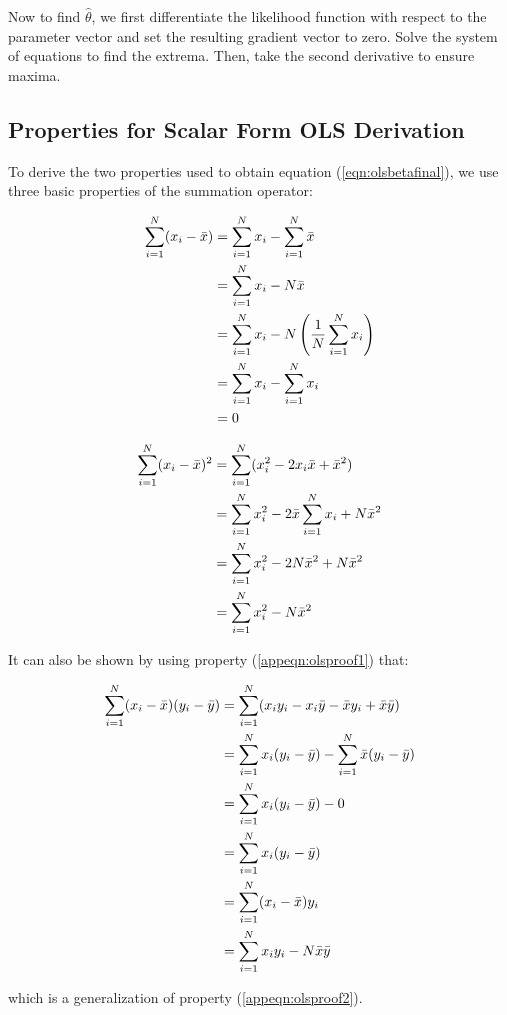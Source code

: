\documentclass{article}
\begin{document}
\noindent Now to find $\hat{\theta}$, we first differentiate the likelihood function with respect to the parameter vector and set the resulting gradient vector to zero. Solve the system of equations to find the extrema. Then, take the second derivative to ensure maxima.




\newpage
{}
\begin{appendices}

\section{Properties for Scalar Form OLS Derivation}\label{app:olspropertiesderiv}

To derive the two properties used to obtain equation (\ref{eqn:olsbetafinal}), we use three basic properties of the summation operator:

\begin{align}\label{appeqn:olsproof1}
    \sum_{i=1}^N (x_i - \Bar{x}) &= \sum_{i=1}^N x_i - \sum_{i=1}^N \Bar{x} \\ \nonumber
    &= \sum_{i=1}^N x_i - N \Bar{x} \\ \nonumber
    &= \sum_{i=1}^N x_i - N \left (\frac{1}{N} \sum_{i=1}^N x_i \right ) \\ \nonumber
    &= \sum_{i=1}^N x_i - \sum_{i=1}^N x_i \\ \nonumber
    &= 0
\end{align} 

\begin{align}\label{appeqn:olsproof2}
        \sum_{i=1}^N (x_i - \Bar{x})^2 &= \sum_{i=1}^N (x_i^2 - 2x_i \Bar{x}  + \Bar{x}^2) \\ \nonumber
        &= \sum_{i=1}^N x_i^2 - 2\Bar{x} \sum_{i=1}^N x_i + N\Bar{x}^2 \\ \nonumber
        &= \sum_{i=1}^N x_i^2 - 2N\Bar{x}^2 + N\Bar{x}^2 \\ \nonumber
        &= \sum_{i=1}^Nx_i^2 - N\Bar{x}^2 
\end{align}

\noindent It can also be shown by using property (\ref{appeqn:olsproof1}) that: 

\begin{align}\label{appeqn:olsproof3}
    \sum_{i=1}^N (x_i - \Bar{x})(y_i - \Bar{y}) &= \sum_{i=1}^N ( x_i y_i - x_i \Bar{y} - \Bar{x}y_i + \Bar{x} \Bar{y}) \\ \nonumber
    &= \sum_{i=1}^N x_i(y_i - \Bar{y}) - \sum_{i=1}^N \Bar{x}(y_i - \Bar{y}) \\ \nonumber
    &= \sum_{i=1}^N x_i(y_i - \Bar{y}) - 0 \\ \nonumber
    &= \sum_{i=1}^N x_i(y_i - \Bar{y}) \\ \nonumber
    &= \sum_{i=1}^N (x_i - \Bar{x})y_i \\ \nonumber
    &= \sum_{i=1}^N x_i y_i - N\Bar{x} \Bar{y} 
\end{align}

\noindent which is a generalization of property (\ref{appeqn:olsproof2}).

\end{appendices}
\end{document}
